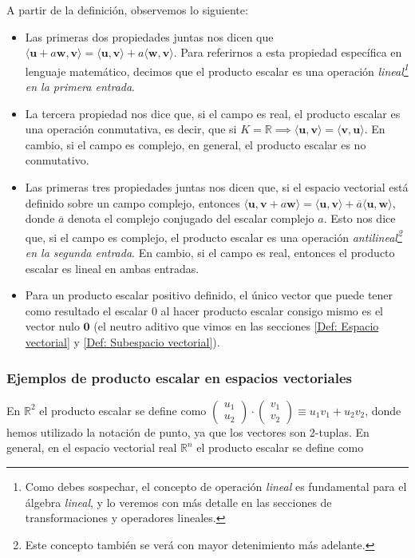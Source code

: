 \documentclass[notasLineal]{subfile}
\begin{document}
A partir de la definición, observemos lo siguiente:

\begin{itemize}
    \item Las primeras dos propiedades juntas nos dicen que $\langle\mathbf{u}+a\mathbf{w},\mathbf{v}\rangle = \langle\mathbf{u},\mathbf{v}\rangle+a\langle\mathbf{w},\mathbf{v}\rangle$. Para referirnos a esta propiedad específica en lenguaje matemático, decimos que el producto escalar es una operación \textit{lineal\footnote{Como debes sospechar, el concepto de operación \emph{lineal} es fundamental para el álgebra \emph{lineal}, y lo veremos con más detalle en las secciones de transformaciones y operadores lineales.} en la primera entrada}.
    \item La tercera propiedad nos dice que, si el campo es real, el producto escalar es una operación conmutativa, es decir, que si $K=\mathbb{R}\implies\langle\mathbf{u},\mathbf{v}\rangle=\langle\mathbf{v},\mathbf{u}\rangle$. En cambio, si el campo es complejo, en general, el producto escalar es no conmutativo.
    \item Las primeras tres propiedades juntas nos dicen que, si el espacio vectorial está definido sobre un campo complejo, entonces $\langle\mathbf{u},\mathbf{v}+a\mathbf{w}\rangle = \langle\mathbf{u},\mathbf{v}\rangle+\overline{a}\langle\mathbf{u},\mathbf{w}\rangle$, donde $\overline{a}$ denota el complejo conjugado del escalar complejo $a$. Esto nos dice que, si el campo es complejo, el producto escalar es una operación \textit{antilineal\footnote{Este concepto también se verá con mayor detenimiento más adelante.} en la segunda entrada}. En cambio, si el campo es real, entonces el producto escalar es lineal en ambas entradas.
    \item Para un producto escalar positivo definido, el único vector que puede tener como resultado el escalar $0$ al hacer producto escalar consigo mismo es el vector nulo $\mathbf{0}$ (el neutro aditivo que vimos en las secciones \ref{Def: Espacio vectorial} y \ref{Def: Subespacio vectorial}).
\end{itemize}


\subsubsection{Ejemplos de producto escalar en espacios vectoriales} \label{Ejem:Producto_escalar}

En $\mathbb{R}^2$ el producto escalar se define como $\begin{pmatrix}u_1\\u_2\end{pmatrix}\cdot\begin{pmatrix}v_1\\v_2\end{pmatrix} \equiv u_1v_1+u_2v_2$, donde hemos utilizado la notación de punto, ya que los vectores son 2-tuplas. En general, en el espacio vectorial real $\mathbb{R}^n$ el producto escalar se define como
\end{document}
